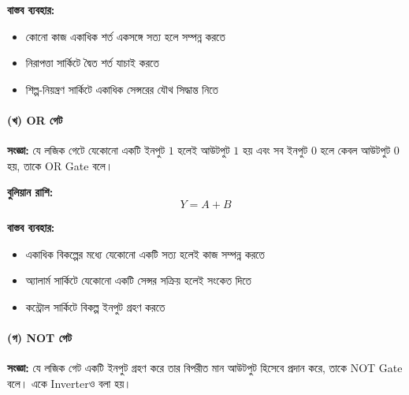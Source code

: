 \textbf{বাস্তব ব্যবহার:}
\begin{itemize}[label={{\bulletfont\textbullet}}, leftmargin=*, nosep]
    \item কোনো কাজ একাধিক শর্ত একসঙ্গে সত্য হলে সম্পন্ন করতে
    \item নিরাপত্তা সার্কিটে দ্বৈত শর্ত যাচাই করতে
    \item শিল্প-নিয়ন্ত্রণ সার্কিটে একাধিক সেন্সরের যৌথ সিদ্ধান্ত নিতে
\end{itemize}


\paragraph{(খ) \textenglish{OR} গেট}

\textbf{সংজ্ঞা:}
যে লজিক গেটে যেকোনো একটি ইনপুট \(1\) হলেই আউটপুট \(1\) হয় এবং সব ইনপুট \(0\) হলে কেবল আউটপুট \(0\) হয়, তাকে \textenglish{OR Gate} বলে।

\textbf{বুলিয়ান রাশি:}
\[
Y=A+B
\]

\textbf{বাস্তব ব্যবহার:}
\begin{itemize}[label={{\bulletfont\textbullet}}, leftmargin=*, nosep]
    \item একাধিক বিকল্পের মধ্যে যেকোনো একটি সত্য হলেই কাজ সম্পন্ন করতে
    \item অ্যালার্ম সার্কিটে যেকোনো একটি সেন্সর সক্রিয় হলেই সংকেত দিতে
    \item কন্ট্রোল সার্কিটে বিকল্প ইনপুট গ্রহণ করতে
\end{itemize}


\paragraph{(গ) \textenglish{NOT} গেট}

\textbf{সংজ্ঞা:}
যে লজিক গেট একটি ইনপুট গ্রহণ করে তার বিপরীত মান আউটপুট হিসেবে প্রদান করে, তাকে \textenglish{NOT Gate} বলে। একে \textenglish{Inverter}ও বলা হয়।

